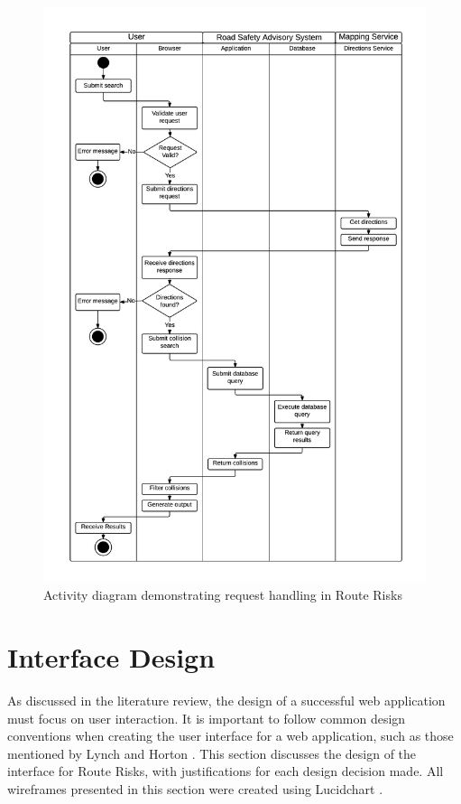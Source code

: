 \documentclass[authoryearcitations]{UoYCSproject}
\begin{document}
\begin{figure}
	\center
	\includegraphics[scale=0.65]{activitydiagram}
	\caption{Activity diagram demonstrating request handling in Route Risks}
	\label{fig:activitydiagram}
\end{figure}

\section{Interface Design}

As discussed in the literature review, the design of a successful web application must focus on user interaction. It is important to follow common design conventions when creating the user interface for a web application, such as those mentioned by Lynch and Horton \citep{Lynch2009}. This section discusses the design of the interface for Route Risks, with justifications for each design decision made. All wireframes presented in this section were created using Lucidchart \citep{LucidSoftware}.
\end{document}
